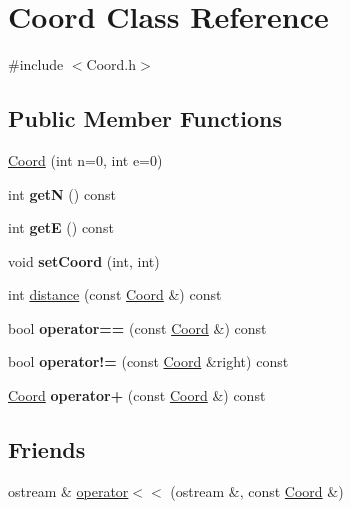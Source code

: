 \hypertarget{classCoord}{
\section{Coord Class Reference}
\label{classCoord}
}


{\ttfamily \#include $<$Coord.h$>$}

\subsection*{Public Member Functions}
\begin{DoxyCompactItemize}
\item 
\hyperlink{classCoord_a53d5f6425739961501a3b17a4c8c5cc9}{Coord} (int n=0, int e=0)
\item 
\hypertarget{classCoord_ad3122fab63f11589f2035c2d20edae9f}{
int {\bfseries getN} () const }
\label{classCoord_ad3122fab63f11589f2035c2d20edae9f}

\item 
\hypertarget{classCoord_addb5b3fb5bb11c019685739cb5edd84b}{
int {\bfseries getE} () const }
\label{classCoord_addb5b3fb5bb11c019685739cb5edd84b}

\item 
\hypertarget{classCoord_a1ba6db2eb1e55571a7102751b6233407}{
void {\bfseries setCoord} (int, int)}
\label{classCoord_a1ba6db2eb1e55571a7102751b6233407}

\item 
int \hyperlink{classCoord_a76eed02c3406cadff19136cf6016f73a}{distance} (const \hyperlink{classCoord}{Coord} \&) const 
\item 
\hypertarget{classCoord_a1d5dcd6b06440e0bf961ddfbc4679a3c}{
bool {\bfseries operator==} (const \hyperlink{classCoord}{Coord} \&) const }
\label{classCoord_a1d5dcd6b06440e0bf961ddfbc4679a3c}

\item 
\hypertarget{classCoord_aae671464859631f5cc4c84c39f1f37a5}{
bool {\bfseries operator!=} (const \hyperlink{classCoord}{Coord} \&right) const }
\label{classCoord_aae671464859631f5cc4c84c39f1f37a5}

\item 
\hypertarget{classCoord_a32e008eb465971de720cba0470d0a06a}{
\hyperlink{classCoord}{Coord} {\bfseries operator+} (const \hyperlink{classCoord}{Coord} \&) const }
\label{classCoord_a32e008eb465971de720cba0470d0a06a}

\end{DoxyCompactItemize}
\subsection*{Friends}
\begin{DoxyCompactItemize}
\item 
ostream \& \hyperlink{classCoord_a3336e09424c5c7145f570643d05e0c44}{operator$<$$<$} (ostream \&, const \hyperlink{classCoord}{Coord} \&)
\end{DoxyCompactItemize}


